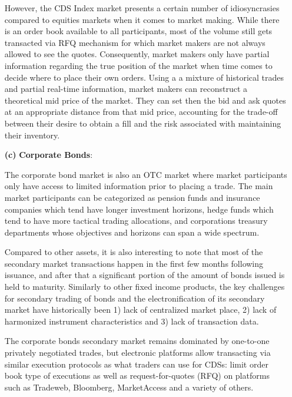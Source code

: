 \begin{enumerate}
However, the CDS Index market presents a certain number of idiosyncrasies compared to equities markets when it comes to market making. While there is an order book available to all participants, most of the volume still gets transacted via RFQ mechanism for which market makers are not always allowed to see the quotes. Consequently, market makers only have partial information regarding the true position of the market when time comes to decide where to place their own orders. Using a a mixture of historical trades and partial real-time information, market makers can reconstruct a theoretical mid price of the market. They can set then the bid and ask quotes at an appropriate distance from that mid price, accounting for the trade-off between their desire to obtain a fill and the risk associated with maintaining their inventory. 


\item[\textbf{(c)}] \textbf{Corporate Bonds}: 

The corporate bond market is also an OTC market where market participants only have access to limited information prior to placing a trade. The main market participants can be categorized as pension funds and insurance companies which tend have longer investment horizons, hedge funds which tend to have more tactical trading allocations, and corporations treasury departments whose objectives and horizons can span a wide spectrum.


Compared to other assets, it is also interesting to note that most of the secondary market transactions happen in the first few months following issuance, and after that a significant portion of the amount of bonds issued is held to maturity. Similarly to other fixed income products, the key challenges for secondary trading of bonds and the electronification of its secondary market have historically been 1) lack of centralized market place, 2) lack of harmonized instrument characteristics and 3) lack of transaction data.


The corporate bonds secondary market remains dominated by one-to-one privately negotiated trades, but electronic platforms allow transacting via similar execution protocols as what traders can use for CDSs: limit order book type of executions as well as request-for-quotes (RFQ) on platforms such as Tradeweb, Bloomberg, MarketAccess and a variety of others.



\end{enumerate}
